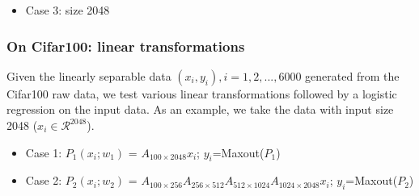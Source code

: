 \begin{itemize}
	\item Case 3: size 2048
\end{itemize}
\begin{table}[H]
	\caption{ResNet18 on CIFAR-10: $J=1,\nu_1=2,c_f^1=c_u^1=8$, with stride 2 pooling (8 channels)}
	\begin{center}
		
	\end{center}
\end{table}

\subsubsection{On Cifar100: linear transformations}
Given the linearly separable data $(x_i,y_i), i=1,2,...,6000$ generated from the Cifar100 raw data, we test various linear transformations followed by a logistic regression on the input data. As an example, we take the data with input size 2048 ($x_i\in \mathcal{R^2048}$).
\begin{itemize}
\item Case 1: $P_1(x_i;w_1)$ = $A_{100\times 2048}x_i$; $y_i$=Maxout($P_1$)\\
\item Case 2: $P_2(x_i;w_2)$ = $A_{100\times 256}A_{256\times 512}A_{512\times 1024}A_{1024\times 2048}x_i$; $y_i$=Maxout($P_2$)\\
\end{itemize}


\begin{table}[H]
	\caption{On Cifar100: linear transformations + logistic regression on linearly separable data (dimension 2048).}
	\begin{center}
	\end{center}
\end{table}



